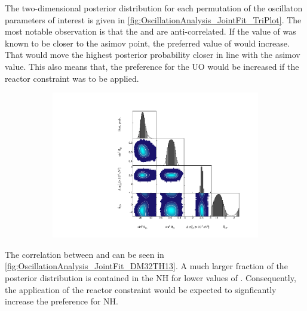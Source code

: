 \clearpage

The two-dimensional posterior distribution for each permutation of the oscillaton parameters of interest is given in \autoref{fig:OscillationAnalysis_JointFit_TriPlot}. The most notable observation is that the \sinsqreac and \sinsqatm are anti-correlated. If the value of \sinsqreac was known to be closer to the asimov point, the preferred value of \sinsqatm would increase. That would move the highest posterior probability closer in line with the asimov value. This also means that, the preference for the UO would be increased if the reactor constraint was to be applied. 

\begin{figure}[h]
  \begin{subfigure}[t]{1.0\textwidth}
    \includegraphics[width=\textwidth, trim={0mm 0mm 0mm 0mm}, clip,page=1]{Figures/OA/JointFit/Contours_1D_woRC_UnSmeared_CredibleInterval_TrianglePlot.pdf}
  \end{subfigure}
  \caption{}
  \label{fig:OscillationAnalysis_JointFit_TriPlot}
\end{figure}

The correlation between \sinsqreac and \delmsqatm can be seen in \autoref{fig:OscillationAnalysis_JointFit_DM32TH13}. A much larger fraction of the posterior distribution is contained in the NH for lower values of \sinsqreac. Consequently, the application of the reactor constraint would be expected to signficantly increase the preference for NH.

